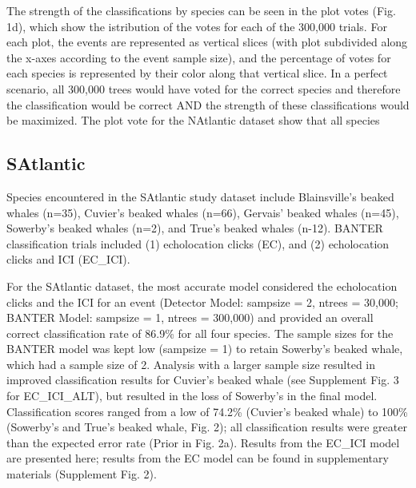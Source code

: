 \documentclass[
  authoryear,
  preprint,
  3p]{elsarticle}
\begin{document}
The strength of the classifications by species can be seen in the plot
votes (Fig. 1d), which show the istribution of the votes for each of the
300,000 trials. For each plot, the events are represented as vertical
slices (with plot subdivided along the x-axes according to the event
sample size), and the percentage of votes for each species is
represented by their color along that vertical slice. In a perfect
scenario, all 300,000 trees would have voted for the correct species and
therefore the classification would be correct AND the strength of these
classifications would be maximized. The plot vote for the NAtlantic
dataset show that all species

\hypertarget{satlantic}{%
\subsection{SAtlantic}\label{satlantic}}

Species encountered in the SAtlantic study dataset include Blainsville's
beaked whales (n=35), Cuvier's beaked whales (n=66), Gervais' beaked
whales (n=45), Sowerby's beaked whales (n=2), and True's beaked whales
(n-12). BANTER classification trials included (1) echolocation clicks
(EC), and (2) echolocation clicks and ICI (EC\_ICI).

For the SAtlantic dataset, the most accurate model considered the
echolocation clicks and the ICI for an event (Detector Model: sampsize =
2, ntrees = 30,000; BANTER Model: sampsize = 1, ntrees = 300,000) and
provided an overall correct classification rate of 86.9\% for all four
species. The sample sizes for the BANTER model was kept low (sampsize =
1) to retain Sowerby's beaked whale, which had a sample size of 2.
Analysis with a larger sample size resulted in improved classification
results for Cuvier's beaked whale (see Supplement Fig. 3 for
EC\_ICI\_ALT), but resulted in the loss of Sowerby's in the final model.
Classification scores ranged from a low of 74.2\% (Cuvier's beaked
whale) to 100\% (Sowerby's and True's beaked whale, Fig. 2); all
classification results were greater than the expected error rate (Prior
in Fig. 2a). Results from the EC\_ICI model are presented here; results
from the EC model can be found in supplementary materials (Supplement
Fig. 2).
\end{document}
